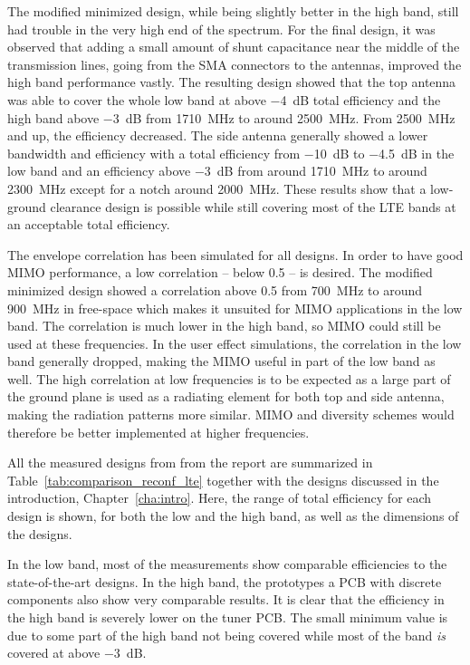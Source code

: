 The modified minimized design, while being slightly better in the high band, still had trouble in the very high end of the spectrum. For the final design, it was observed that adding a small amount of shunt capacitance near the middle of the transmission lines, going from the SMA connectors to the antennas, improved the high band performance vastly. The resulting design showed that the top antenna was able to cover the whole low band at above \SI{-4}{dB} total efficiency and the high band above \SI{-3}{dB} from \SI{1710}{MHz} to around \SI{2500}{MHz}. From \SI{2500}{MHz} and up, the efficiency decreased. The side antenna generally showed a lower bandwidth and efficiency with a total efficiency from \SI{-10}{dB} to \SI{-4.5}{dB} in the low band and an efficiency above \SI{-3}{dB} from around \SI{1710}{MHz} to around \SI{2300}{MHz} except for a notch around \SI{2000}{MHz}. These results show that a low-ground clearance design is possible while still covering most of the LTE bands at an acceptable total efficiency.

The envelope correlation has been simulated for all designs. In order to have good MIMO performance, a low correlation -- below 0.5 -- is desired. The modified minimized design showed a correlation above 0.5 from \SI{700}{MHz} to around \SI{900}{MHz} in free-space which makes it unsuited for MIMO applications in the low band. The correlation is much lower in the high band, so MIMO could still be used at these frequencies. In the user effect simulations, the correlation in the low band generally dropped, making the MIMO useful in part of the low band as well. The high correlation at low frequencies is to be expected as a large part of the ground plane is used as a radiating element for both top and side antenna, making the radiation patterns more similar. MIMO and diversity schemes would therefore be better implemented at higher frequencies.

\newpage



All the measured designs from from the report are summarized in Table~\ref{tab:comparison_reconf_lte} together with the designs discussed in the introduction, Chapter~\ref{cha:intro}. Here, the range of total efficiency for each design is shown, for both the low and the high band, as well as the dimensions of the designs. 

In the low band, most of the measurements show comparable efficiencies to the state-of-the-art designs. In the high band, the prototypes a PCB with discrete components also show very comparable results. It is clear that the efficiency in the high band is severely lower on the tuner PCB. The small minimum value is due to some part of the high band not being covered while most of the band \emph{is} covered at above \SI{-3}{dB}.

